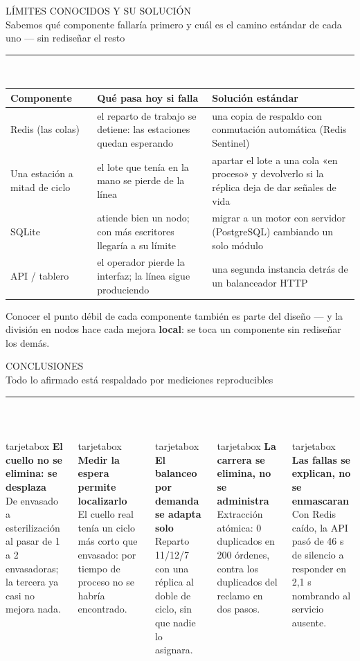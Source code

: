 \documentclass[aspectratio=169,10pt]{beamer}
\newcommand{\titulo}[2]{%
  \vspace{0.12cm}%
  {\dinfont\LARGE\color{marino}\MakeUppercase{#1}}\\[0.3ex]
  {\normalsize\color{grisazul}#2}\\[0.2ex]
  {\color{tealu}\rule{2.2cm}{2pt}}\\[0.6ex]}
\newcommand{\tarjeta}[2]{%
  \begin{beamercolorbox}[wd=\linewidth, sep=5pt, rounded=true]{tarjetabox}%
  {\small\bfseries\color{marino}#1}\\[2pt]{\footnotesize\color{grisazul}#2}%
  \end{beamercolorbox}}
\begin{document}
\begin{frame}
\titulo{Límites conocidos y su solución}{Sabemos qué componente fallaría primero y cuál es el camino estándar de cada uno — sin rediseñar el resto}
\begin{center}
{\footnotesize\setlength{\tabcolsep}{5pt}
\begin{tabular}{L{2.6cm} L{4.9cm} L{5.3cm}}
\toprule
\textbf{Componente} & \textbf{Qué pasa hoy si falla} & \textbf{Solución estándar} \\
\midrule
Redis (las colas) & el reparto de trabajo se detiene: las estaciones quedan esperando & una copia de respaldo con conmutación automática (Redis Sentinel) \\
Una estación a mitad de ciclo & el lote que tenía en la mano se pierde de la línea & apartar el lote a una cola «en proceso» y devolverlo si la réplica deja de dar señales de vida \\
SQLite & atiende bien un nodo; con más escritores llegaría a su límite & migrar a un motor con servidor (PostgreSQL) cambiando un solo módulo \\
API / tablero & el operador pierde la interfaz; la línea sigue produciendo & una segunda instancia detrás de un balanceador HTTP \\
\bottomrule
\end{tabular}}
\end{center}
\vspace{0.15cm}
{\small Conocer el punto débil de cada componente también es parte del diseño — y la división en nodos hace cada mejora \textbf{local}: se toca un componente sin rediseñar los demás.}
\end{frame}

\begin{frame}
\titulo{Conclusiones}{Todo lo afirmado está respaldado por mediciones reproducibles}
\begin{columns}[T]
\tarjeta{El cuello no se elimina: se desplaza}{De envasado a esterilización al pasar de 1 a 2 envasadoras; la tercera ya casi no mejora nada.}
\vspace{0.12cm}
\tarjeta{Medir la espera permite localizarlo}{El cuello real tenía un ciclo más corto que envasado: por tiempo de proceso no se habría encontrado.}
\vspace{0.12cm}
\tarjeta{El balanceo por demanda se adapta solo}{Reparto 11/12/7 con una réplica al doble de ciclo, sin que nadie lo asignara.}
\tarjeta{La carrera se elimina, no se administra}{Extracción atómica: 0 duplicados en 200 órdenes, contra los duplicados del reclamo en dos pasos.}
\vspace{0.12cm}
\tarjeta{Las fallas se explican, no se enmascaran}{Con Redis caído, la API pasó de 46 s de silencio a responder en 2,1 s nombrando al servicio ausente.}
\end{columns}
\end{frame}
\end{document}
